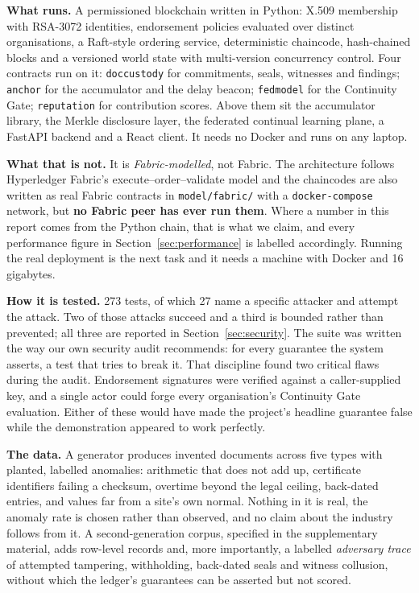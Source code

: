 \documentclass[11pt,a4paper]{article}
\begin{document}
\textbf{What runs.} A permissioned blockchain written in Python: X.509 membership
with RSA-3072 identities, endorsement policies evaluated over distinct
organisations, a Raft-style ordering service, deterministic chaincode, hash-chained
blocks and a versioned world state with multi-version concurrency control. Four
contracts run on it: \texttt{doccustody} for commitments, seals, witnesses and
findings; \texttt{anchor} for the accumulator and the delay beacon;
\texttt{fedmodel} for the Continuity Gate; \texttt{reputation} for contribution
scores. Above them sit the accumulator library, the Merkle disclosure layer, the
federated continual learning plane, a FastAPI backend and a React client. It needs
no Docker and runs on any laptop.

\textbf{What that is not.} It is \emph{Fabric-modelled}, not Fabric. The
architecture follows Hyperledger Fabric's execute--order--validate model and the
chaincodes are also written as real Fabric contracts in \texttt{model/fabric/}
with a \texttt{docker-compose} network, but \textbf{no Fabric peer has ever run
them}. Where a number in this report comes from the Python chain, that is what we
claim, and every performance figure in Section~\ref{sec:performance} is labelled
accordingly. Running the real deployment is the next task and it needs a machine
with Docker and 16 gigabytes.

\textbf{How it is tested.} 273 tests, of which 27 name a specific attacker and
attempt the attack. Two of those attacks succeed and a third is bounded rather
than prevented; all three are reported in Section~\ref{sec:security}. The suite was written the way our own
security audit recommends: for every guarantee the system asserts, a test that
tries to break it. That discipline found two critical flaws during the audit.
Endorsement signatures were verified against a caller-supplied key, and a single
actor could forge every organisation's Continuity Gate evaluation. Either of these
would have made the project's headline guarantee false while the demonstration
appeared to work perfectly.

\textbf{The data.} A generator produces invented documents across five types with
planted, labelled anomalies: arithmetic that does not add up, certificate
identifiers failing a checksum, overtime beyond the legal ceiling, back-dated
entries, and values far from a site's own normal. Nothing in it is real, the
anomaly rate is chosen rather than observed, and no claim about the industry
follows from it. A second-generation corpus, specified in the supplementary
material, adds row-level records and, more importantly, a labelled
\emph{adversary trace} of attempted tampering, withholding, back-dated seals and
witness collusion, without which the ledger's guarantees can be asserted but not
scored.
\end{document}
